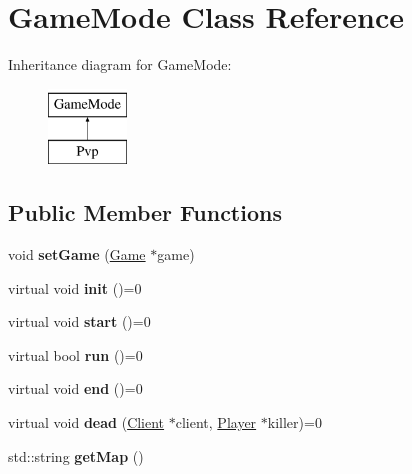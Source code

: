 \hypertarget{class_game_mode}{\section{Game\-Mode Class Reference}
\label{class_game_mode}
}
Inheritance diagram for Game\-Mode\-:\begin{figure}[H]
\begin{center}
\leavevmode
\includegraphics[height=2.000000cm]{class_game_mode}
\end{center}
\end{figure}
\subsection*{Public Member Functions}
\begin{DoxyCompactItemize}
\item 
\hypertarget{class_game_mode_a5068689080951363e2a8b916a06cfff0}{void {\bfseries set\-Game} (\hyperlink{class_game}{Game} $\ast$game)}\label{class_game_mode_a5068689080951363e2a8b916a06cfff0}

\item 
\hypertarget{class_game_mode_a877e49dda28119348f9e676eb1342de6}{virtual void {\bfseries init} ()=0}\label{class_game_mode_a877e49dda28119348f9e676eb1342de6}

\item 
\hypertarget{class_game_mode_a4cc9ce98debe0b3936d445b8ac1c9d6d}{virtual void {\bfseries start} ()=0}\label{class_game_mode_a4cc9ce98debe0b3936d445b8ac1c9d6d}

\item 
\hypertarget{class_game_mode_a5dda4096cf04853d305160304e8825a1}{virtual bool {\bfseries run} ()=0}\label{class_game_mode_a5dda4096cf04853d305160304e8825a1}

\item 
\hypertarget{class_game_mode_abefa73c7af17e0b8af8e7b7d592935f4}{virtual void {\bfseries end} ()=0}\label{class_game_mode_abefa73c7af17e0b8af8e7b7d592935f4}

\item 
\hypertarget{class_game_mode_a4a7487b6968e0286ca3ab14f6982184b}{virtual void {\bfseries dead} (\hyperlink{class_client}{Client} $\ast$client, \hyperlink{class_player}{Player} $\ast$killer)=0}\label{class_game_mode_a4a7487b6968e0286ca3ab14f6982184b}

\item 
\hypertarget{class_game_mode_aebbc62a355d49a6ff8bc6b55c96bbc7c}{std\-::string {\bfseries get\-Map} ()}\label{class_game_mode_aebbc62a355d49a6ff8bc6b55c96bbc7c}

\end{DoxyCompactItemize}
